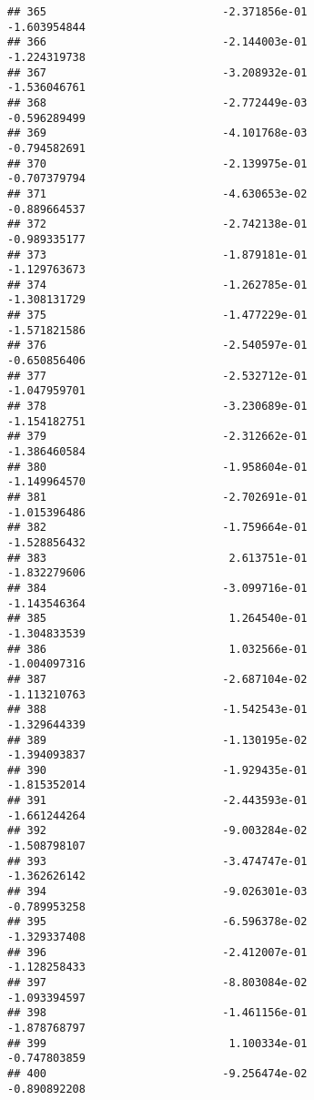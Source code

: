 \documentclass[
]{article}
\begin{document}
\begin{verbatim}
## 365                           -2.371856e-01               -1.603954844
## 366                           -2.144003e-01               -1.224319738
## 367                           -3.208932e-01               -1.536046761
## 368                           -2.772449e-03               -0.596289499
## 369                           -4.101768e-03               -0.794582691
## 370                           -2.139975e-01               -0.707379794
## 371                           -4.630653e-02               -0.889664537
## 372                           -2.742138e-01               -0.989335177
## 373                           -1.879181e-01               -1.129763673
## 374                           -1.262785e-01               -1.308131729
## 375                           -1.477229e-01               -1.571821586
## 376                           -2.540597e-01               -0.650856406
## 377                           -2.532712e-01               -1.047959701
## 378                           -3.230689e-01               -1.154182751
## 379                           -2.312662e-01               -1.386460584
## 380                           -1.958604e-01               -1.149964570
## 381                           -2.702691e-01               -1.015396486
## 382                           -1.759664e-01               -1.528856432
## 383                            2.613751e-01               -1.832279606
## 384                           -3.099716e-01               -1.143546364
## 385                            1.264540e-01               -1.304833539
## 386                            1.032566e-01               -1.004097316
## 387                           -2.687104e-02               -1.113210763
## 388                           -1.542543e-01               -1.329644339
## 389                           -1.130195e-02               -1.394093837
## 390                           -1.929435e-01               -1.815352014
## 391                           -2.443593e-01               -1.661244264
## 392                           -9.003284e-02               -1.508798107
## 393                           -3.474747e-01               -1.362626142
## 394                           -9.026301e-03               -0.789953258
## 395                           -6.596378e-02               -1.329337408
## 396                           -2.412007e-01               -1.128258433
## 397                           -8.803084e-02               -1.093394597
## 398                           -1.461156e-01               -1.878768797
## 399                            1.100334e-01               -0.747803859
## 400                           -9.256474e-02               -0.890892208

\end{verbatim}
\end{document}
